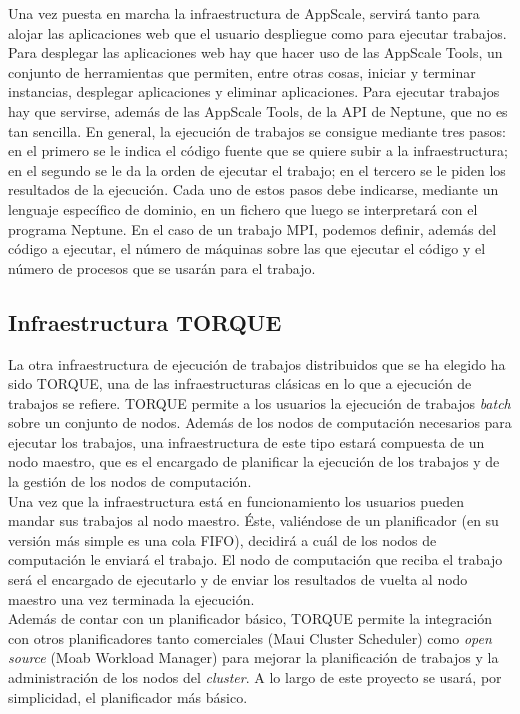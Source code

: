 Una vez puesta en marcha la infraestructura de AppScale, servirá tanto para alojar las aplicaciones web que el usuario despliegue como para ejecutar trabajos. Para desplegar las aplicaciones web hay que hacer uso de las AppScale Tools, un conjunto de herramientas que permiten, entre otras cosas, iniciar y terminar instancias, desplegar aplicaciones y eliminar aplicaciones. Para ejecutar trabajos hay que servirse, además de las AppScale Tools, de la API de Neptune, que no es tan sencilla. En general, la ejecución de trabajos se consigue mediante tres pasos: en el primero se le indica el código fuente que se quiere subir a la infraestructura; en el segundo se le da la orden de ejecutar el trabajo; en el tercero se le piden los resultados de la ejecución. Cada uno de estos pasos debe indicarse, mediante un lenguaje específico de dominio, en un fichero que luego se interpretará con el programa Neptune. En el caso de un trabajo MPI, podemos definir, además del código a ejecutar, el número de máquinas sobre las que ejecutar el código y el número de procesos que se usarán para el trabajo.


\subsection{Infraestructura TORQUE}

La otra infraestructura de ejecución de trabajos distribuidos que se ha elegido ha sido TORQUE, una de las infraestructuras clásicas en lo que a ejecución de trabajos se refiere. TORQUE permite a los usuarios la ejecución de trabajos \emph{batch} sobre un conjunto de nodos. Además de los nodos de computación necesarios para ejecutar los trabajos, una infraestructura de este tipo estará compuesta de un nodo maestro, que es el encargado de planificar la ejecución de los trabajos y de la gestión de los nodos de computación. \\

Una vez que la infraestructura está en funcionamiento los usuarios pueden mandar sus trabajos al nodo maestro. Éste, valiéndose de un planificador (en su versión más simple es una cola FIFO), decidirá a cuál de los nodos de computación le enviará el trabajo. El nodo de computación que reciba el trabajo será el encargado de ejecutarlo y de enviar los resultados de vuelta al nodo maestro una vez terminada la ejecución. \\

Además de contar con un planificador básico, TORQUE permite la integración con otros planificadores tanto comerciales (Maui Cluster Scheduler) como \emph{open source} (Moab Workload Manager) para mejorar la planificación de trabajos y la administración de los nodos del \emph{cluster}. A lo largo de este proyecto se usará, por simplicidad, el planificador más básico. \\

